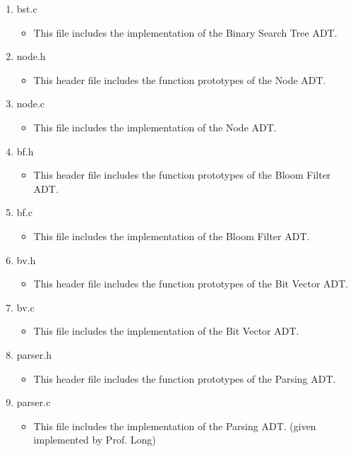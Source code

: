 \documentclass[
	12pt, %
]{fphw}
\begin{document}
\begin{enumerate}
	\item bst.c
	\begin{itemize}
		\item This file includes the implementation of the Binary Search Tree ADT.
	\end{itemize}
	
	\item node.h
	\begin{itemize}
		\item This header file includes the function prototypes of the Node ADT.
	\end{itemize}
	
	\item node.c
	\begin{itemize}
		\item This file includes the implementation of the Node ADT.
	\end{itemize}
	
	\item bf.h
	\begin{itemize}
		\item This header file includes the function prototypes of the Bloom Filter ADT.
	\end{itemize}
	
	\item bf.c
	\begin{itemize}
		\item This file includes the implementation of the Bloom Filter ADT.
	\end{itemize}
	
	\item bv.h
	\begin{itemize}
		\item This header file includes the function prototypes of the Bit Vector ADT.
	\end{itemize}
	
	\item bv.c
	\begin{itemize}
		\item This file includes the implementation of the Bit Vector ADT.
	\end{itemize}
	
	\item parser.h
	\begin{itemize}
		\item This header file includes the function prototypes of the Parsing ADT.
	\end{itemize}
	
	\item parser.c
	\begin{itemize}
		\item This file includes the implementation of the Parsing ADT. (given implemented by Prof. Long)
	\end{itemize}
		

\end{enumerate}
\end{document}
